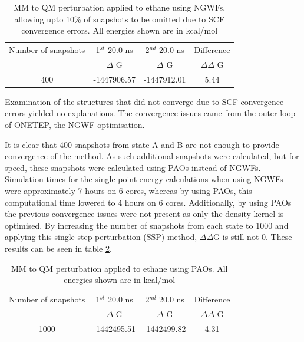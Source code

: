 \begin{table}[ht]
 \caption{MM to QM perturbation applied to ethane using NGWFs, allowing upto 10\% of snapshots to be omitted due to SCF convergence errors.  All energies shown are in kcal/mol}
  \begin{center}
  \begin{tabular}{c|c|c|c}
   \hline\hline
 Number of snapshots & 1$^{st}$ 20.0 ns & 2$^{nd}$ 20.0 ns & Difference \\
 & $\Delta$ G & $\Delta$ G & $\Delta \Delta$ G  \\
\hline
400 & -1447906.57 & -1447912.01 & 5.44 \\
  \end{tabular}\label{table:ethane_NGWF}
 \end{center}
\end{table}
%
Examination of the structures that did not converge due to SCF convergence errors yielded no explanations.  The convergence issues came from the outer loop of ONETEP, the NGWF optimisation.

It is clear that 400 snapshots from state A and B are not enough to provide convergence of the method.  As such additional snapshots were calculated, but for speed, these snapshots were calculated using PAOs instead of NGWFs.  Simulation times for the single point energy calculations when using NGWFs were approximately 7 hours on 6 cores, whereas by using PAOs, this computational time lowered to 4 hours on 6 cores.  Additionally, by using PAOs the previous convergence issues were not present as only the density kernel is optimised.  By increasing the number of snapshots from each state to 1000 and applying this single step perturbation (SSP) method, $\Delta \Delta $G is still not 0.  These results can be seen in table \ref{table:ethane_PAO}.

\begin{table}[ht]
 \caption{MM to QM perturbation applied to ethane using PAOs.  All energies shown are in kcal/mol}
  \begin{center}
  \begin{tabular}{c|c|c|c}
   \hline\hline
 Number of snapshots & 1$^{st}$ 20.0 ns & 2$^{nd}$ 20.0 ns & Difference \\
 & $\Delta$ G & $\Delta$ G & $\Delta \Delta$ G  \\ [0.5ex]
\hline
1000 & -1442495.51 & -1442499.82 & 4.31 \\
  \end{tabular}\label{table:ethane_PAO}
 \end{center}
\end{table}

